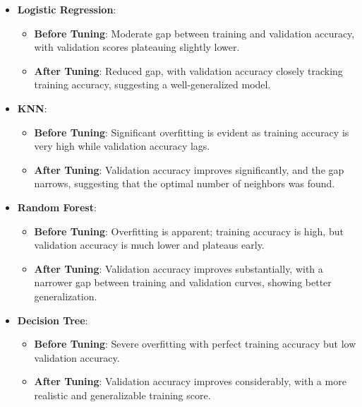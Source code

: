 \documentclass[12pt]{report}
\begin{document}
\begin{itemize}
	\setlength\itemsep{-1.5em}
		\item \textbf{Logistic Regression}:
		\vspace{-1.25em}	
		\begin{itemize}
					\setlength\itemsep{-1.5em}
					\item \textbf{Before Tuning}: Moderate gap between training and validation accuracy, with validation scores plateauing slightly lower.
					\item \textbf{After Tuning}: Reduced gap, with validation accuracy closely tracking training accuracy, suggesting a well-generalized model.
			\end{itemize}
		\item \textbf{KNN}:
		\vspace{-1.25em}	
		\begin{itemize}
					\setlength\itemsep{-1.5em}
					\item \textbf{Before Tuning}: Significant overfitting is evident as training accuracy is very high while validation accuracy lags.
					\item \textbf{After Tuning}: Validation accuracy improves significantly, and the gap narrows, suggesting that the optimal number of neighbors was found.
				\end{itemize}
		\item \textbf{Random Forest}:
		\vspace{-1.25em}	
		\begin{itemize}
				\setlength\itemsep{-1.5em}
        \item \textbf{Before Tuning}: Overfitting is apparent; training accuracy is high, but validation accuracy is much lower and plateaus early.
        \item \textbf{After Tuning}: Validation accuracy improves substantially, with a narrower gap between training and validation curves, showing better generalization.
			\end{itemize}
		\item \textbf{Decision Tree}:
		\vspace{-1.25em}	
		\begin{itemize}
				\setlength\itemsep{-1.5em}
        \item \textbf{Before Tuning}: Severe overfitting with perfect training accuracy but low validation accuracy.
        \item \textbf{After Tuning}: Validation accuracy improves considerably, with a more realistic and generalizable training score.

\end{itemize}
\end{itemize}
\end{document}

